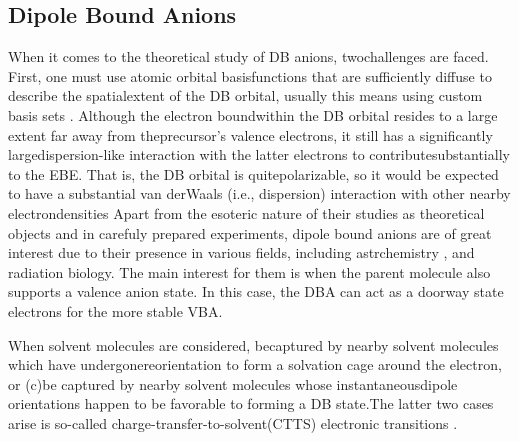 \subsection{Dipole Bound Anions}
When it comes to the theoretical study of DB anions, twochallenges are faced. First, one must use atomic orbital basisfunctions that are sufficiently diffuse to describe the spatialextent of the DB orbital, usually this means using custom basis sets \cite{skurski2000choose}.
Although the electron boundwithin the DB orbital resides to a large extent far away from theprecursor's valence electrons, it still has a significantly largedispersion-like interaction with the latter electrons to contributesubstantially to the EBE. That is, the DB orbital is quitepolarizable, so it would be expected to have a substantial van derWaals (i.e., dispersion) interaction with other nearby electrondensities\cite{gutowski1996contribution}
Apart from the esoteric nature of their studies as theoretical objects and in carefuly prepared experiments, dipole bound anions are of great interest due to their presence in various fields, including astrchemistry \cite{fortenberry2015interstellar}, and radiation biology\cite{narayanan2023secondary,sedmidubska2024interaction}. The main interest for them is when the parent molecule also supports a valence anion state. In this case, the DBA can act as a doorway state electrons for the more stable VBA.

When solvent molecules are considered, becaptured by nearby solvent molecules which have undergonereorientation to form a solvation cage around the electron, or (c)be captured by nearby solvent molecules whose instantaneousdipole orientations happen to be favorable to forming a DB state.The latter two cases arise is so-called charge-transfer-to-solvent(CTTS) electronic transitions \cite{bradforth2002excited,chen2000precursors}.

